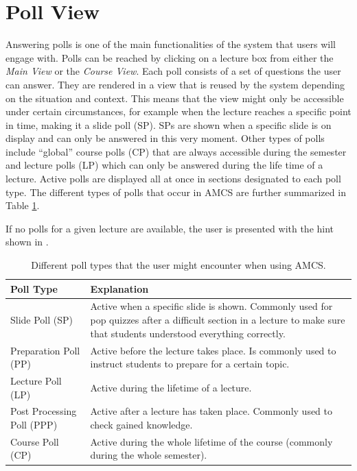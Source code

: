 \section{Poll View}
\label{section:soa:pollview}
Answering polls is one of the main functionalities of the system that users will engage with.
Polls can be reached by clicking on a lecture box from either the \emph{Main View} or the \emph{Course View}.
Each poll consists of a set of questions the user can answer. They are rendered in a view that is reused  by the system depending on the situation and context. This means that the view might only be accessible under certain circumstances, for example when the lecture reaches a specific point in time, making it a slide poll (SP). SPs are shown when a specific slide is on display and can only be answered in this very moment. Other types of polls include “global” course polls (CP) that are always accessible during the semester and lecture polls (LP) which can only be answered during the life time of a lecture.
Active polls are displayed all at once in sections designated to each poll type.
The different types of polls that occur in AMCS are further summarized in Table \ref{tab:pollTypes}.

If no polls for a given lecture are available, the user is presented with the hint shown in \todogrf.

\begin{table}[t]
	{\renewcommand{\arraystretch}{2}
		\begin{tabular}{ | p{5cm} | p{10cm} |}
			\hline
			Poll Type & Explanation \\ \hline \hline
			Slide Poll (SP) & Active when a specific slide is shown. Commonly used for pop quizzes after a difficult section in a lecture to make sure that students understood everything correctly. \\ \hline
			Preparation Poll (PP) & Active before the lecture takes place. Is commonly used to instruct students to prepare for a certain topic. \\ \hline
			Lecture Poll (LP) & Active during the lifetime of a lecture. \\ \hline
			Post Processing Poll (PPP) & Active after a lecture has taken place. Commonly used to check gained knowledge. \\ \hline
			Course Poll (CP) & Active during the whole lifetime of the course (commonly during the whole semester). \\
			\hline
		\end{tabular}
	}
	\caption{Different poll types that the user might encounter when using AMCS.}
	\label{tab:pollTypes}
\end{table}

